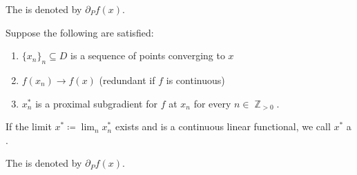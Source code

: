 \begin{definition}
\begin{thmenum}
    The  is denoted by \( \partial_P f(x) \).

    Suppose the following are satisfied:
    \begin{enumerate}
      \item \( \{ x_n \}_n \subseteq D \) is a sequence of points converging to \( x \)
      \item \( f(x_n) \to f(x) \) (redundant if \( f \) is continuous)
      \item \( x_n^* \) is a proximal subgradient for \( f \) at \( x_n \) for every \( n \in \BbbZ_{>0} \).
    \end{enumerate}

    If the limit \( x^* \coloneqq \lim_n x_n^* \) exists and is a continuous linear functional, we call \( x^* \) a .

    The  is denoted by \( \partial_P f(x) \).
  \end{thmenum}
\end{definition}
